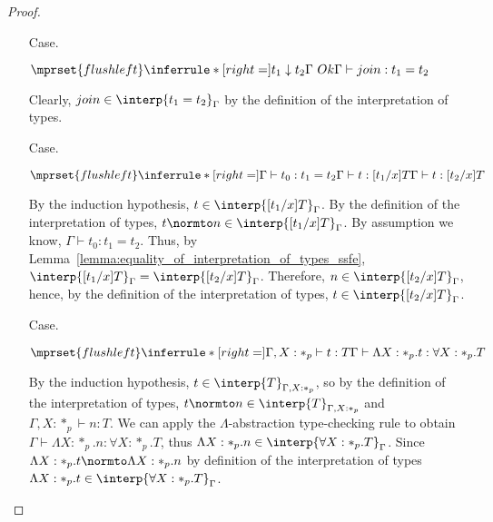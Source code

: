 \begin{proof}
\begin{itemize}
\item[Case.]\ \\
  \begin{center}
    \begin{math}
      $$\mprset{flushleft}
      \inferrule* [right=] {
        t_1 \downarrow t_2
	\\
	\Gamma\ Ok
      }{\Gamma \vdash join : t_1 = t_2}
    \end{math}
  \end{center}
  Clearly, $join \in \interp{t_1 = t_2}_\Gamma$ by the definition of the 
  interpretation of types.
  
\item[Case.]\ \\
  \begin{center}
    \begin{math}
      $$\mprset{flushleft}
      \inferrule* [right=] {
        \Gamma \vdash t_0:t_1 = t_2
        \\
        \Gamma \vdash t:[t_1/x]T
      }{\Gamma \vdash t:[t_2/x]T}
    \end{math}
  \end{center}
  By the induction hypothesis, $t \in \interp{[t_1/x]T}_\Gamma$.
  By the definition of the interpretation of types, $t \normto n \in
  \interp{[t_1/x]T}_\Gamma$.  By assumption we know, $\Gamma \vdash
  t_0:t_1 = t_2$. Thus, by
  Lemma~\ref{lemma:equality_of_interpretation_of_types_ssfe},
  $\interp{[t_1/x]T}_\Gamma = \interp{[t_2/x]T}_\Gamma$.
  Therefore, $n \in \interp{[t_2/x]T}_\Gamma$, hence, by the
  definition of the interpretation of types, $t \in
  \interp{[t_2/x]T}_\Gamma$.
  
\item[Case.]\ \\
  \begin{center}
    \begin{math}
      $$\mprset{flushleft}
      \inferrule* [right=] {
        \Gamma, X : *_p \vdash t : T
      }{\Gamma \vdash \Lambda X:*_p.t:\forall X:*_p.T}
    \end{math}
  \end{center}
  By the induction hypothesis, $t \in \interp{T}_{\Gamma,X:*_p}$, so
  by the definition of the interpretation of types, $t \normto n \in
  \interp{T}_{\Gamma,X:*_p}$ and $\Gamma,X:*_p \vdash n:T$.
  We can apply the $\Lambda$-abstraction type-checking rule to
  obtain $\Gamma \vdash \Lambda X:*_p.n:\forall X:*_p.T$, thus
  $\Lambda X:*_p.n \in \interp{\forall X:*_p.T}_{\Gamma}$.  Since
  $\Lambda X:*_p.t \normto \Lambda X:*_p.n$ by definition of the
  interpretation of types 
  $\Lambda X:*_p.t \in \interp{\forall X:*_p.T}_{\Gamma}$.


\end{itemize}
\end{proof}
